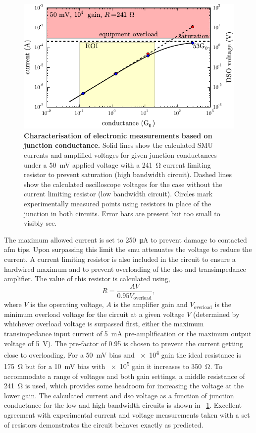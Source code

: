 \documentclass{article}
\begin{document}
\begin{figure}[bt]
\centering
\includegraphics{figures/hb_electronics_limits}
\caption[Characterisation of electronic measurements based on junction conductance.]{\textbf{Characterisation of electronic measurements based on junction conductance.} Solid lines show the calculated SMU currents and amplified voltages for given junction conductances under a \SI{50}{mV} applied voltage with a \SI{241}{\ohm} current limiting resistor to prevent saturation (high bandwidth circuit). Dashed lines show the calculated oscilloscope voltages for the case without the current limiting resistor (low bandwidth circuit). Circles mark experimentally measured points using resistors in place of the junction in both circuits. Error bars are present but too small to visibly see.}
\label{fig:hb_electronics_limits}
\end{figure}

The maximum allowed current is set to \SI{250}{\micro\ampere} to prevent damage to contacted \gls{afm} tips. Upon surpassing this limit the \gls{smu} attenuates the voltage to reduce the current. A current limiting resistor is also included in the circuit to ensure a hardwired maximum and to prevent overloading of the \gls{dso} and transimpedance amplifier. The value of this resistor is calculated using,
\begin{equation}
R = \frac{AV}{0.95V_{\mathrm{overload}}},
\end{equation}
where $V$ is the operating voltage, $A$ is the amplifier gain and $V_{\mathrm{overload}}$ is the minimum overload voltage for the circuit at a given voltage $V$ (determined by whichever overload voltage is surpassed first, either the maximum transimpedance input current of \SI{5}{mA} pre-amplification or the maximum output voltage of \SI{5}{V}). The pre-factor of 0.95 is chosen to prevent the current getting close to overloading. For a \SI{50}{mV} bias and \num{e4} gain the ideal resistance is \SI{175}{\ohm} but for a \SI{10}{mV} bias with \num{e5} gain it increases to \SI{350}{\ohm}. To accommodate a range of voltages and both gain settings, a middle resistance of \SI{241}{\ohm} is used, which provides some headroom for increasing the voltage at the lower gain. The calculated current and \gls{dso} voltage as a function of junction conductance for the low and high bandwidth circuits is shown in \figurename~\ref{fig:hb_electronics_limits}. Excellent agreement with experimental current and voltage measurements taken with a set of resistors demonstrates the circuit behaves exactly as predicted.
\end{document}
